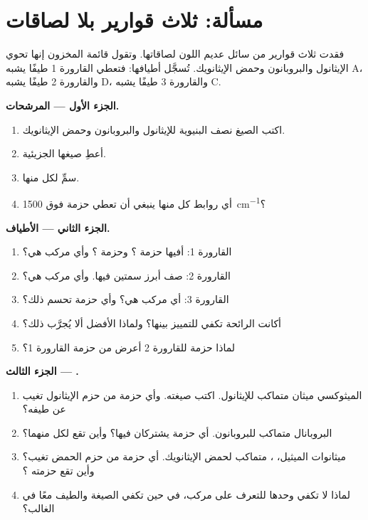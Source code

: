 \section{مسألة: ثلاث قوارير بلا لصاقات}

\begin{problem}
\label{pb:g11:infrared:1}
فقدت ثلاث قوارير من سائل عديم اللون لصاقاتها. وتقول قائمة المخزون
إنها تحوي الإيثانول والبروبانون وحمض الإيثانويك. تُسجَّل أطيافها:
فتعطي القارورة 1 طيفًا يشبه A، والقارورة 2 طيفًا يشبه D، والقارورة 3
طيفًا يشبه C.

\medskip
\noindent\textbf{الجزء الأول --- المرشحات.}
\begin{enumerate}
  \item اكتب الصيغ نصف البنيوية للإيثانول والبروبانون
        وحمض الإيثانويك.
  \item أعطِ صيغها الجزيئية.
  \item سمِّ  لكل منها.
  \item أي روابط كل منها ينبغي أن تعطي حزمة فوق
        \qty{1500}{cm^{-1}}؟
\end{enumerate}

\medskip
\noindent\textbf{الجزء الثاني --- الأطياف.}
\begin{enumerate}[resume]
  \item القارورة 1: أفيها حزمة ؟ وحزمة ؟ وأي
        مركب هي؟
  \item القارورة 2: صف أبرز سمتين فيها. وأي مركب هي؟
  \item القارورة 3: أي مركب هي؟ وأي حزمة تحسم ذلك؟
  \item أكانت الرائحة تكفي للتمييز بينها؟ ولماذا الأفضل ألا
        يُجرَّب ذلك؟
  \item لماذا حزمة  للقارورة 2 أعرض من حزمة القارورة 1؟
\end{enumerate}

\medskip
\noindent\textbf{الجزء الثالث --- .}
\begin{enumerate}[resume]
  \item الميثوكسي ميثان متماكب للإيثانول. اكتب صيغته. وأي
        حزمة من حزم الإيثانول تغيب عن طيفه؟
  \item البروبانال متماكب للبروبانون. أي حزمة يشتركان فيها؟
        وأين تقع لكل منهما؟
  \item ميثانوات الميثيل، ، متماكب لحمض الإيثانويك.
        أي حزمة من حزم الحمض تغيب؟ وأين تقع حزمته
        ؟
  \item لماذا لا تكفي  وحدها للتعرف على مركب، في حين
        تكفي الصيغة والطيف معًا في الغالب؟
\end{enumerate}


\end{problem}
